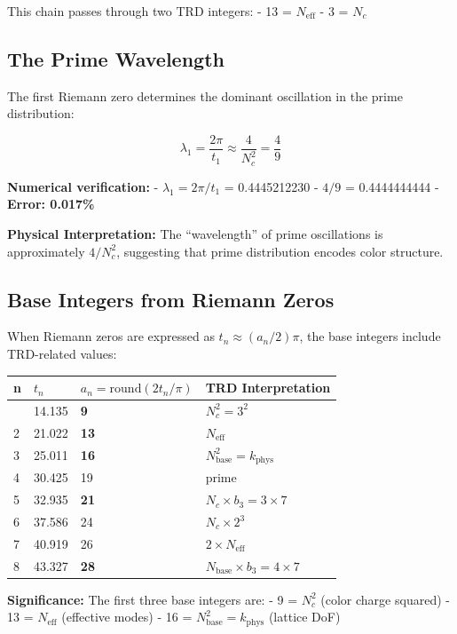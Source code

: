 \documentclass[
  11pt,
  letterpaper,
  twoside,
  openany]{book}
\makeatletter
\let\orig@subsection\subsection
\renewcommand{\subsection}{\needspace{6\baselineskip}\orig@subsection}
\makeatother
\begin{document}
This chain passes through two TRD integers: - 13 = \(N_{\text{eff}}\) -
3 = \(N_c\)

\subsection{The Prime Wavelength}\label{the-prime-wavelength}

The first Riemann zero determines the dominant oscillation in the prime
distribution:

\[\lambda_1 = \frac{2\pi}{t_1} \approx \frac{4}{N_c^2} = \frac{4}{9}\]

\textbf{Numerical verification:} - \(\lambda_1 = 2\pi/t_1\) =
0.4445212230 - \(4/9\) = 0.4444444444 - \textbf{Error: 0.017\%}

\textbf{Physical Interpretation:} The ``wavelength'' of prime
oscillations is approximately \(4/N_c^2\), suggesting that prime
distribution encodes color structure.

\subsection{Base Integers from Riemann
Zeros}\label{base-integers-from-riemann-zeros}

When Riemann zeros are expressed as \(t_n \approx (a_n/2)\pi\), the base
integers include TRD-related values:

\begin{longtable}[]{@{}llll@{}}
\toprule\noalign{}
n & \(t_n\) & \(a_n = \text{round}(2t_n/\pi)\) & TRD Interpretation \\
\midrule\noalign{}
\endhead
\bottomrule\noalign{}
\endlastfoot
1 & 14.135 & \textbf{9} & \(N_c^2 = 3^2\) \\
2 & 21.022 & \textbf{13} & \(N_{\text{eff}}\) \\
3 & 25.011 & \textbf{16} & \(N_{\text{base}}^2 = k_{\text{phys}}\) \\
4 & 30.425 & 19 & prime \\
5 & 32.935 & \textbf{21} & \(N_c \times b_3 = 3 \times 7\) \\
6 & 37.586 & 24 & \(N_c \times 2^3\) \\
7 & 40.919 & 26 & \(2 \times N_{\text{eff}}\) \\
8 & 43.327 & \textbf{28} &
\(N_{\text{base}} \times b_3 = 4 \times 7\) \\
\end{longtable}

\textbf{Significance:} The first three base integers are: - 9 =
\(N_c^2\) (color charge squared) - 13 = \(N_{\text{eff}}\) (effective
modes) - 16 = \(N_{\text{base}}^2 = k_{\text{phys}}\) (lattice DoF)
\end{document}
